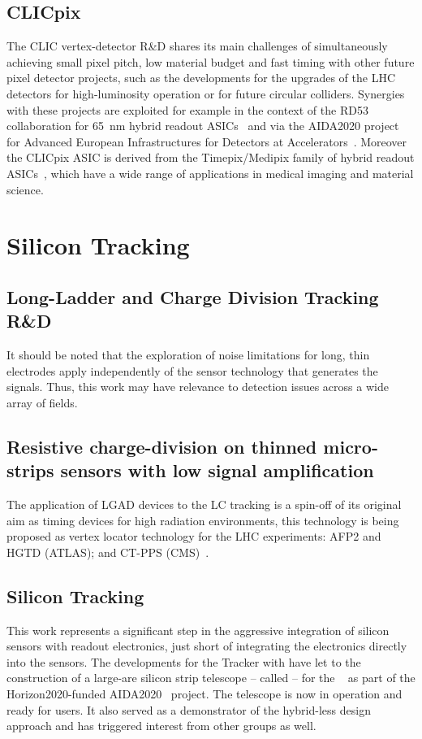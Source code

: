 \subsection{CLICpix}
The CLIC vertex-detector R\&D shares its main challenges of simultaneously achieving small pixel pitch,
low material budget and fast timing with other future pixel detector projects, such as the developments for
the upgrades of the LHC detectors for high-luminosity operation or for future circular colliders.
Synergies with these projects are exploited for example in the context of the RD53 collaboration for \SI{65}{nm} hybrid readout
ASICs~\cite{RD53} and via the AIDA2020 project for Advanced European Infrastructures for Detectors at
Accelerators~\cite{AIDA2020}.
Moreover the CLICpix ASIC is derived from the
Timepix/Medipix family of hybrid readout ASICs~\cite{medipix-collaboration}, which have a wide range of applications in
medical imaging and material science.

\section{Silicon Tracking}
\subsection{Long-Ladder and Charge Division Tracking R\&D}

It should be noted that the exploration of noise limitations for long, thin electrodes apply independently
of the sensor technology that generates the signals. Thus, this work may have
relevance to detection issues across a wide array of fields.

\subsection{Resistive charge-division on thinned micro-strips sensors with low signal amplification}
The application of LGAD devices to the LC tracking is a spin-off of its original aim as timing devices for high radiation environments, this technology is being proposed as vertex locator technology for the LHC experiments: AFP2 and HGTD (ATLAS); and CT-PPS (CMS)~\cite{Sadrozinski:CPAD2015,DallaTorre:2018ttn}.

\subsection{\KPIX Silicon Tracking}
This work represents a significant step in the aggressive integration of silicon sensors with readout electronics, just short of integrating the electronics directly into the sensors. 
The developments for the \SID Tracker with \KPIX have let to the construction of a large-are silicon strip telescope -- called \LYCORIS -- for the \DIITBF~\cite{desytb2018} 
as part of the Horizon2020-funded AIDA2020~\cite{AIDA2020} project.
The telescope is now in operation and ready for users.
It also served as a demonstrator of the hybrid-less design approach and has triggered interest from other groups as well. 


